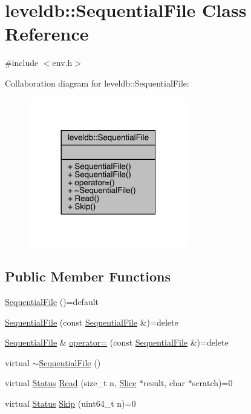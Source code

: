 \hypertarget{classleveldb_1_1_sequential_file}{}\section{leveldb\+::Sequential\+File Class Reference}
\label{classleveldb_1_1_sequential_file}


{\ttfamily \#include $<$env.\+h$>$}



Collaboration diagram for leveldb\+::Sequential\+File\+:
\nopagebreak
\begin{figure}[H]
\begin{center}
\leavevmode
\includegraphics[width=197pt]{classleveldb_1_1_sequential_file__coll__graph}
\end{center}
\end{figure}
\subsection*{Public Member Functions}
\begin{DoxyCompactItemize}
\item 
\mbox{\hyperlink{classleveldb_1_1_sequential_file_ae0d9f919e164c267cf52314050821558}{Sequential\+File}} ()=default
\item 
\mbox{\hyperlink{classleveldb_1_1_sequential_file_a3bd2ee08b4bb4e1c4217f78a83a6f56b}{Sequential\+File}} (const \mbox{\hyperlink{classleveldb_1_1_sequential_file}{Sequential\+File}} \&)=delete
\item 
\mbox{\hyperlink{classleveldb_1_1_sequential_file}{Sequential\+File}} \& \mbox{\hyperlink{classleveldb_1_1_sequential_file_aa3631a78fbab52652dbdd08d9e1e41a7}{operator=}} (const \mbox{\hyperlink{classleveldb_1_1_sequential_file}{Sequential\+File}} \&)=delete
\item 
virtual \mbox{\hyperlink{classleveldb_1_1_sequential_file_aac42452e8a5b3409da0a850775d0a98b}{$\sim$\+Sequential\+File}} ()
\item 
virtual \mbox{\hyperlink{classleveldb_1_1_status}{Status}} \mbox{\hyperlink{classleveldb_1_1_sequential_file_a4136bef1546cdb9fbbd477a635460261}{Read}} (size\+\_\+t n, \mbox{\hyperlink{classleveldb_1_1_slice}{Slice}} $\ast$result, char $\ast$scratch)=0
\item 
virtual \mbox{\hyperlink{classleveldb_1_1_status}{Status}} \mbox{\hyperlink{classleveldb_1_1_sequential_file_a18c94279fc058cad4d03cdfe04b12179}{Skip}} (uint64\+\_\+t n)=0
\end{DoxyCompactItemize}



